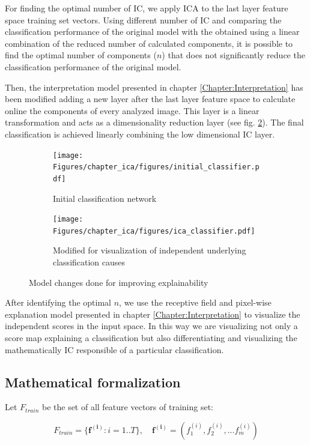 For finding the optimal number of IC, we apply ICA to the last layer feature space training set vectors. Using different number of IC and comparing the classification performance of the original model with the obtained using a linear combination of the reduced number of calculated components, it is possible to find the optimal number of components ($n$) that does not significantly reduce the classification performance of the original model. 

Then, the interpretation model presented in chapter \ref{Chapter:Interpretation} has been modified adding a new layer after the last layer feature space to calculate online the components of every analyzed image. This layer is a linear transformation and acts as a dimensionality reduction layer (see fig. \ref{fig:models}). The final classification is achieved linearly combining the low dimensional IC layer. 

\begin{figure}[h!]
	\centering
	\begin{subfigure}[b]{\textwidth}
		\centering
		\texttt{[image: Figures/chapter\_ica/figures/initial\_classifier.pdf]}
		\caption{Initial classification network}	
	\end{subfigure}
	\hfill   
	\begin{subfigure}[b]{\textwidth}
		\centering
		\texttt{[image: Figures/chapter\_ica/figures/ica\_classifier.pdf]}
		\caption{Modified for visualization of independent underlying classification causes}
		\label{fig:models_ica}
	\end{subfigure}
	\caption{Model changes done for improving explainability}  
	\label{fig:models} 
\end{figure}

After identifying the optimal $n$, we use the receptive field and pixel-wise explanation model presented in chapter \ref{Chapter:Interpretation} to visualize the independent scores in the input space. In this way we are visualizing not only a score map explaining a classification but also differentiating and visualizing the mathematically IC responsible of a particular classification. 

\subsection{Mathematical formalization}

Let $F_{train}$ be the set of all feature vectors of training set:

\begin{equation}
F_{train} = \{\boldsymbol{f^{(i)}} : i = 1 .. T\}, \quad \boldsymbol{f^{(i)}} = (f^{(i)}_1, f^{(i)}_2, ... f^{(i)}_m)
\end{equation}

